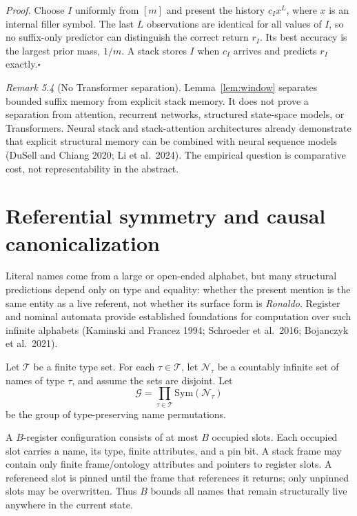 \documentclass[11pt]{article}
\begin{document}
\emph{Proof.} Choose \(I\) uniformly from \([m]\) and present the history \(c_Ix^L\), where \(x\) is an internal filler symbol. The last \(L\) observations are identical for all values of \(I\), so no suffix-only predictor can distinguish the correct return \(r_I\). Its best accuracy is the largest prior mass, \(1/m\). A stack stores \(I\) when \(c_I\) arrives and predicts \(r_I\) exactly.\hfill\(\square\)

\emph{Remark 5.4} (No Transformer separation). Lemma~\ref{lem:window} separates bounded suffix memory from explicit stack memory. It does not prove a separation from attention, recurrent networks, structured state-space models, or Transformers. Neural stack and stack-attention architectures already demonstrate that explicit structural memory can be combined with neural sequence models (DuSell and Chiang 2020; Li et al.~2024). The empirical question is comparative cost, not representability in the abstract.

\section{Referential symmetry and causal canonicalization}\label{referential-symmetry-and-causal-canonicalization}

Literal names come from a large or open-ended alphabet, but many structural predictions depend only on type and equality: whether the present mention is the same entity as a live referent, not whether its surface form is \emph{Ronaldo}. Register and nominal automata provide established foundations for computation over such infinite alphabets (Kaminski and Francez 1994; Schroeder et al.~2016; Bojanczyk et al.~2021).

Let \(\mathcal{T}\) be a finite type set. For each \(\tau\in\mathcal{T}\), let \(\mathcal N_\tau\) be a countably infinite set of names of type \(\tau\), and assume the sets are disjoint. Let \[\mathcal{G}=\prod_{\tau\in\mathcal{T}}\mathrm{Sym}(\mathcal N_\tau)\] be the group of type-preserving name permutations.

A \(B\)-register configuration consists of at most \(B\) occupied slots. Each occupied slot carries a name, its type, finite attributes, and a pin bit. A stack frame may contain only finite frame/ontology attributes and pointers to register slots. A referenced slot is pinned until the frame that references it returns; only unpinned slots may be overwritten. Thus \(B\) bounds all names that remain structurally live anywhere in the current state.
\end{document}
